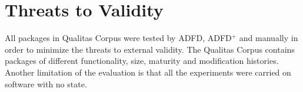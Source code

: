 



%		 





\section{Threats to Validity} \label{sec:threat}
All packages in Qualitas Corpus were tested by ADFD, ADFD$^+$ and manually in order to minimize the threats to external validity. The Qualitas Corpus contains packages of different functionality, size, maturity and modification histories. Another limitation of the evaluation is that all the experiments were carried on software with no state.

